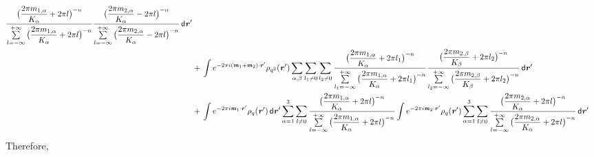 \documentclass[aps,pre,preprint]{revtex4}
\renewcommand{\v}[1]{\textbf{\textit{#1}}}
\renewcommand{\d}[1]{\textsf{#1}}
\begin{document}
\begin{align}
  \frac
  {\big(\dfrac{2\pi m_{1,\alpha}}{K_\alpha} + 2\pi l\big)^{-n}}
  {\sum\limits_{l=-\infty}^{+\infty}
    \big(\dfrac{2\pi m_{1,\alpha}}{K_\alpha} + 2\pi l\big)^{-n}}
  \frac
  {\big(\dfrac{2\pi m_{2,\alpha}}{K_\alpha} - 2\pi l\big)^{-n}}
  {\sum\limits_{l=-\infty}^{+\infty}
    \big(\dfrac{2\pi m_{2,\alpha}}{K_\alpha} - 2\pi l\big)^{-n}}
  \,\d d\v r' \\\nonumber
  & + \,
  \int
  e^{-2\pi i (\v m_1 + \v m_2)\cdot\v r'}\rho_{q^2}(\v r')
  \sum_{\alpha, \beta}\sum_{l_1\neq 0}\sum_{l_2\neq 0}
  \frac
  {\big(\dfrac{2\pi m_{1,\alpha}}{K_\alpha} + 2\pi l_1\big)^{-n}}
  {\sum\limits_{l_1=-\infty}^{+\infty}
    \big(\dfrac{2\pi m_{1,\alpha}}{K_\alpha} + 2\pi l_1\big)^{-n}}
  \frac
  {\big(\dfrac{2\pi m_{2,\beta}}{K_\beta} + 2\pi l_2\big)^{-n}}
  {\sum\limits_{l_2=-\infty}^{+\infty}
    \big(\dfrac{2\pi m_{2,\beta}}{K_\beta} + 2\pi l_2\big)^{-n}}
  \,\d d\v r' \\\nonumber
  &+ \,
  \int
  e^{-2\pi i\v m_1\cdot\v r'}\rho_q(\v r')\,\d d\v r'
  \sum_{\alpha=1}^3\sum_{l\neq 0}
  \frac
  {\big(\dfrac{2\pi m_{1,\alpha}}{K_\alpha} + 2\pi l\big)^{-n}}
  {\sum\limits_{l=-\infty}^{+\infty}
    \big(\dfrac{2\pi m_{1,\alpha}}{K_\alpha} + 2\pi l\big)^{-n}}
  \int
  e^{-2\pi i\v m_2\cdot\v r'}\rho_q(\v r')
  \sum_{\alpha=1}^3\sum_{l\neq 0}
  \frac
  {\big(\dfrac{2\pi m_{2,\alpha}}{K_\alpha} + 2\pi l\big)^{-n}}
  {\sum\limits_{l=-\infty}^{+\infty}
    \big(\dfrac{2\pi m_{2,\alpha}}{K_\alpha} + 2\pi l\big)^{-n}}
  \,\d d\v r'  
\end{align}
Therefore,
\end{document}

